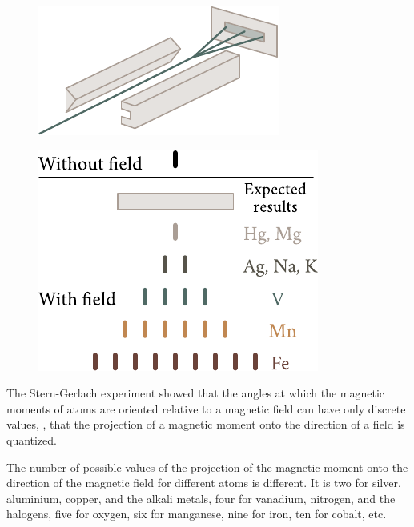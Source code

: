 \begin{figure}[!htb]
	\begin{minipage}[t]{0.45\linewidth}
		\begin{center}
			\includegraphics[scale=1]{figures/ch_07/fig_7_12.pdf}
			\caption[]{}
			\label{fig:7_12}
		\end{center}
	\end{minipage}
	\hfill{ }%
	\begin{minipage}[t]{0.52\linewidth}
		\begin{center}
			\includegraphics[scale=1]{figures/ch_07/fig_7_13.pdf}
			\caption[]{}
			\label{fig:7_13}
		\end{center}
	\end{minipage}
\vspace{-0.4cm}
\end{figure}

The Stern-Gerlach experiment showed that the angles at which the magnetic moments of atoms are oriented relative to a magnetic field can have only discrete values, \ie, that the projection of a magnetic moment onto the direction of a field is quantized.

The number of possible values of the projection of the magnetic moment onto the direction of the magnetic field for different atoms is different.
It is two for silver, aluminium, copper, and the alkali metals, four for vanadium, nitrogen, and the halogens, five for oxygen, six for manganese, nine for iron, ten for cobalt, etc.

